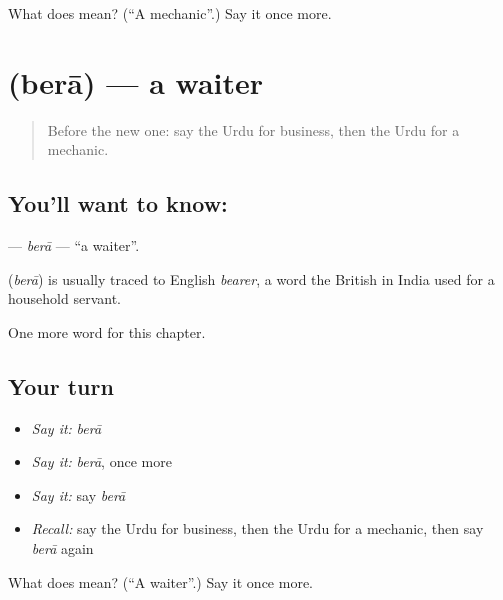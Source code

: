 \begin{tcolorbox}[breakable,colback=teal!4,colframe=teal!35!black,title={Before you move on}]
What does  mean? (\textquotedblleft{}A mechanic\textquotedblright{}.) Say it once more.
\end{tcolorbox}
\section[\texorpdfstring{\ur{بیرا} (berā)}{بیرا (berā)}]{ (berā) — a waiter}

\label{lesson:UR-C237-bera}



\begin{quote}
Before the new one: say the Urdu for business, then the Urdu for a mechanic.
\end{quote}

\subsection*{You'll want to know: }
\textbf{} — \emph{berā} — \textquotedblleft{}a waiter\textquotedblright{}.

\begin{cousinweb}
\textbf{} (\emph{berā}) is usually traced to English \emph{bearer}, a word the British in India used for a household servant.
\end{cousinweb}

\begin{grammarlens}[title={What you've built}]
One more word for this chapter.
\end{grammarlens}

\subsection*{Your turn}
\begin{itemize}
\raggedright
  \item \emph{Say it:} \emph{berā}
  \item \emph{Say it:} \emph{berā}, once more
  \item \emph{Say it:} say \emph{berā}
  \item \emph{Recall:} say the Urdu for business, then the Urdu for a mechanic, then say \emph{berā} again
\end{itemize}

\begin{tcolorbox}[breakable,colback=teal!4,colframe=teal!35!black,title={Before you move on}]
What does  mean? (\textquotedblleft{}A waiter\textquotedblright{}.) Say it once more.
\end{tcolorbox}

